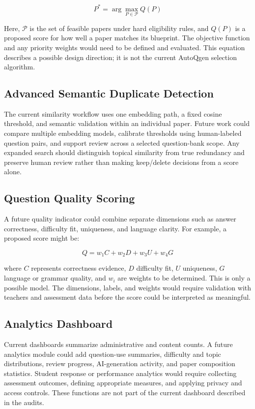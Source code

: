 \[
P^{*} = \arg\max_{P \in \mathcal{P}} Q(P)
\]

Here, \(\mathcal{P}\) is the set of feasible papers under hard eligibility rules, and \(Q(P)\) is a proposed score for how well a paper matches its blueprint. The objective function and any priority weights would need to be defined and evaluated. This equation describes a possible design direction; it is not the current AutoQgen selection algorithm.

\subsection{Advanced Semantic Duplicate Detection}

The current similarity workflow uses one embedding path, a fixed cosine threshold, and semantic validation within an individual paper. Future work could compare multiple embedding models, calibrate thresholds using human-labeled question pairs, and support review across a selected question-bank scope. Any expanded search should distinguish topical similarity from true redundancy and preserve human review rather than making keep/delete decisions from a score alone.

\subsection{Question Quality Scoring}

A future quality indicator could combine separate dimensions such as answer correctness, difficulty fit, uniqueness, and language clarity. For example, a proposed score might be:

\[
Q = w_{1}C + w_{2}D + w_{3}U + w_{4}G
\]

where \(C\) represents correctness evidence, \(D\) difficulty fit, \(U\) uniqueness, \(G\) language or grammar quality, and \(w_i\) are weights to be determined. This is only a possible model. The dimensions, labels, and weights would require validation with teachers and assessment data before the score could be interpreted as meaningful.

\subsection{Analytics Dashboard}

Current dashboards summarize administrative and content counts. A future analytics module could add question-use summaries, difficulty and topic distributions, review progress, AI-generation activity, and paper composition statistics. Student response or performance analytics would require collecting assessment outcomes, defining appropriate measures, and applying privacy and access controls. These functions are not part of the current dashboard described in the audits.

